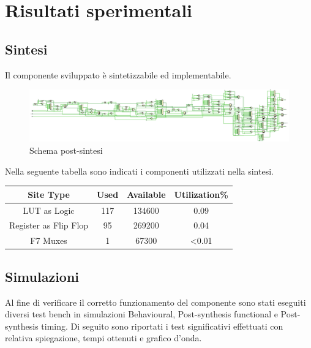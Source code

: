 \documentclass{article}
\begin{document}

\section{Risultati sperimentali}
\subsection{Sintesi}
Il componente sviluppato è sintetizzabile ed implementabile. 
\begin{figure}[H]
	\centering
	\includegraphics[width=1\textwidth]{Assets/schematic.eps}
	\caption{Schema post-sintesi}
\end{figure}
Nella seguente tabella sono indicati i componenti utilizzati nella sintesi.
\begin{center}
	\begin{tabular}{|c|c|c|c|}
		\hline
		Site Type   & Used & Available & Utilization\% \\
		\hline
		LUT as Logic & 117 & 134600 & 0.09 \\
		\hline
		Register as Flip Flop & 95 & 269200  & 0.04\\
		\hline
		F7 Muxes & 1 & 67300 & <0.01\\
		\hline
	\end{tabular}
\end{center}



\subsection{Simulazioni}
Al fine di verificare il corretto funzionamento del componente sono stati eseguiti diversi test bench in simulazioni Behavioural, Post-synthesis functional e Post-synthesis timing. 
Di seguito sono riportati i test significativi effettuati con relativa spiegazione, tempi ottenuti e grafico d'onda.
\end{document}
